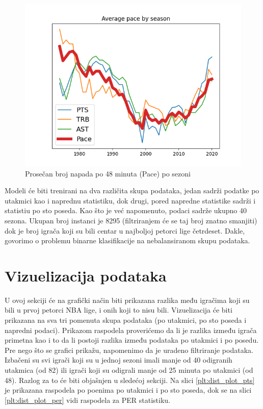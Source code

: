 \documentclass[a4paper]{article}
\begin{document}
\begin{figure}[h!]
\begin{center}
\includegraphics[scale=0.70]{pace_season.png}
\end{center}
\caption{Prosečan broj napada po 48 minuta (Pace) po sezoni}
\label{plt:pace_season}
\end{figure}

Modeli će biti trenirani na dva različita skupa podataka, jedan sadrži podatke po utakmici kao i naprednu statistiku, dok drugi, pored napredne statistike sadrži i statistiu po sto poseda. Kao što je već napomenuto, podaci sadrže ukupno 40 sezona. Ukupan broj instanci je 8295 (filtriranjem će se taj broj znatno smanjiti) dok je broj igrača koji su bili centar u najboljoj petorci lige četrdeset. Dakle, govorimo o problemu binarne klasifikacije na nebalansiranom skupu podataka.

\section{Vizuelizacija podataka}
\label{sec:vizuelizacija}

U ovoj sekciji će na grafički način biti prikazana razlika među igračima koji
su bili u prvoj petorci NBA lige, i onih koji to nisu bili. Vizuelizacija će biti
prikazana na sva tri pomenuta skupa podataka (po utakmici, po sto poseda i napredni podaci). Prikazom raspodela proverićemo da li je razlika između igrača primetna kao i to da li postoji razlika između podataka po utakmici i po posedu. Pre nego što se grafici prikažu, napomenimo da je uradeno filtriranje podataka. Izbačeni su svi igrači koji su u jednoj sezoni imali manje od 40 odigranih utakmica (od 82) ili igrači koji su odigrali manje od 25 minuta po utakmici (od 48). Razlog za to će biti objašnjen u sledećoj sekciji. Na slici \ref{plt:dist_plot_pts} je prikazana raspodela po poenima po utakmici i po sto poseda, dok se na slici \ref{plt:dist_plot_per} vidi raspodela za PER statistiku.
\end{document}
